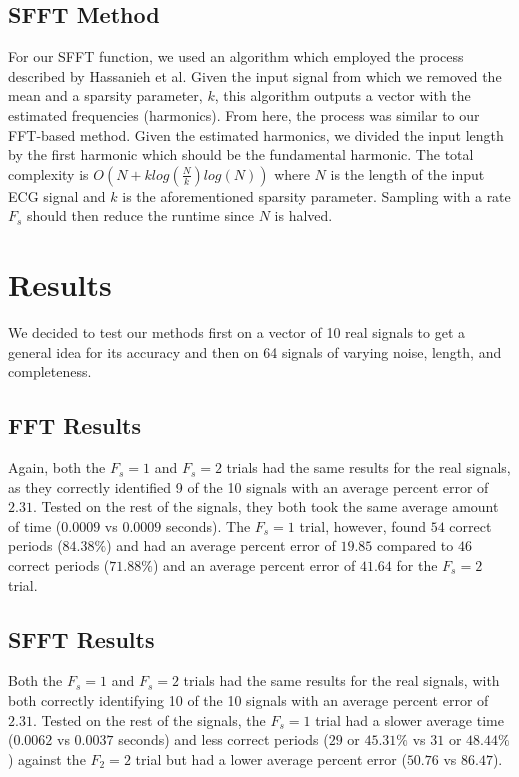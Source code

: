 \documentclass[twocolumn]{article}
\begin{document}
\begin{flushleft}
		\hspace{2em}\subsection{SFFT Method}
		For our SFFT function, we used an algorithm which employed the process described by Hassanieh et al\cite{paperSFFT}. Given the input signal from which we removed the mean and a sparsity parameter, $k$, this algorithm outputs a vector with the estimated frequencies (harmonics). From here, the process was similar to our FFT-based method. Given the estimated harmonics, we divided the input length by the first harmonic which should be the fundamental harmonic. The total complexity is $O(N + klog(\frac{N}{k})log(N))$ where $N$ is the length of the input ECG signal and $k$ is the aforementioned sparsity parameter. Sampling with a rate $F_{s}$ should then reduce the runtime since $N$ is halved.  \\ \vspace{-1em}
		
		\section{Results}
		We decided to test our methods first on a vector of 10 real signals to get a general idea for its accuracy and then on 64 signals of varying noise, length, and completeness. \\ \vspace{-2em}
		
		\hspace{2em}\subsection{FFT Results} \label{ssec:resultsFFT}
		Again, both the $F_{s}=1$ and $F_{s}=2$ trials had the same results for the real signals, as they correctly identified 9 of the 10 signals with an average percent error of $2.31$. Tested on the rest of the signals, they both took the same average amount of time ($0.0009$ vs $0.0009$ seconds). The $F_{s}=1$ trial, however, found $54$ correct periods ($84.38\%$) and had an average percent error of $19.85$ compared to $46$ correct periods ($71.88\%$) and an average percent error of $41.64$ for the $F_{s}=2$ trial. \\ \vspace{-2em}
		
		\hspace{2em}\subsection{SFFT Results}  \label{ssec:resultsSFFT}
		Both the $F_{s}=1$ and $F_{s}=2$ trials had the same results for the real signals, with both correctly identifying 10 of the 10 signals with an average percent error of $2.31$. Tested on the rest of the signals, the $F_{s}=1$ trial had a slower average time ($0.0062$ vs $0.0037$ seconds) and less correct periods ($29$  or $45.31\%$ vs $31$ or $48.44\%$) against the $F_{2}=2$ trial but had a lower average percent error ($50.76$ vs $86.47$). \\ \vspace{-1em}


\end{flushleft}
\end{document}
